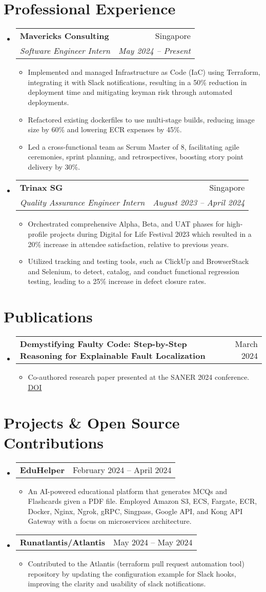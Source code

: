 \documentclass[letterpaper,11pt]{article}
\makeatletter
\newcommand{\resumeItem}[1]{
  \item\small{
    {#1 \vspace{-2pt}}
  }
}
\newcommand{\resumeSubheading}[4]{
  \vspace{-2pt}\item
    \begin{tabular*}{0.97\textwidth}[t]{l@{\extracolsep{\fill}}r}
      \textbf{#1} & #2 \\
      \textit{\small#3} & \textit{\small #4} \\
    \end{tabular*}\vspace{-7pt}
}
\newcommand{\resumeProjectHeading}[2]{
    \item
    \begin{tabular*}{0.97\textwidth}{l@{\extracolsep{\fill}}r}
      \small#1 & #2 \\
    \end{tabular*}\vspace{-7pt}
}
\newcommand{\resumeSubHeadingListStart}{\begin{itemize}[leftmargin=0.15in, label={}]}
\newcommand{\resumeSubHeadingListEnd}{\end{itemize}}
\newcommand{\resumeItemListStart}{\begin{itemize}}
\newcommand{\resumeItemListEnd}{\end{itemize}\vspace{-5pt}}
\makeatother
\begin{document}
\section{Professional Experience}
  \resumeSubHeadingListStart
  \resumeSubheading
      {Mavericks Consulting}{Singapore }
      {Software Engineer Intern}{May 2024 -- Present}
      \resumeItemListStart
        \resumeItem{Implemented and managed Infrastructure as Code (IaC) using Terraform, integrating it with Slack notifications, resulting in a 50\% reduction in deployment time and mitigating keyman risk through automated deployments.}
        \resumeItem{Refactored existing dockerfiles to use multi-stage builds, reducing image size by 60\% and lowering ECR expenses by 45\%.}
 \resumeItem{Led a cross-functional team as Scrum Master of 8, facilitating agile ceremonies, sprint planning, and retrospectives, boosting story point delivery by 30\%. }
      \resumeItemListEnd
    \resumeSubheading
      {Trinax SG}{Singapore }
      {Quality Assurance Engineer Intern}{August 2023 -- April 2024}
      \resumeItemListStart
        \resumeItem{Orchestrated comprehensive Alpha, Beta, and UAT phases for high-profile projects during Digital for Life Festival 2023 which resulted in a 20\% increase in attendee satisfaction, relative to previous years.}
        \resumeItem{Utilized tracking and testing tools, such as ClickUp and BrowserStack and Selenium, to detect, catalog, and conduct functional regression testing, leading to a 25\% increase in defect closure rates.}
      \resumeItemListEnd
  \resumeSubHeadingListEnd

\section{Publications}
  \resumeSubHeadingListStart
    \resumeProjectHeading
      {\textbf{Demystifying Faulty Code: Step-by-Step Reasoning for Explainable Fault Localization}}{March 2024}
    \resumeItemListStart
      \resumeItem{Co-authored research paper presented at the SANER 2024 conference. \href{https://doi.org/10.48550/arXiv.2403.10507}{\underline{DOI}}}
    \resumeItemListEnd
  \resumeSubHeadingListEnd
      
\section{Projects \& Open Source Contributions}
  \resumeSubHeadingListStart
    \resumeProjectHeading
      {\textbf{EduHelper}}{February 2024 -- April 2024}
    \resumeItemListStart
      \resumeItem{An AI-powered educational platform that generates MCQs and Flashcards given a PDF file. Employed Amazon S3, ECS, Fargate, ECR, Docker, Nginx, Ngrok, gRPC, Singpass, Google API, and Kong API Gateway with a focus on microservices architecture.}
    \resumeItemListEnd
    \resumeProjectHeading
      {\textbf{Runatlantis/Atlantis}}{May 2024 -- May 2024}
    \resumeItemListStart
      \resumeItem{Contributed to the Atlantis (terraform pull request automation tool) repository by updating the configuration example for Slack hooks, improving the clarity and usability of slack notifications.}
    \resumeItemListEnd
  \resumeSubHeadingListEnd
\end{document}
